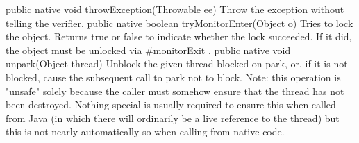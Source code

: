  public native  void throwException(Throwable ee)
Throw the exception without telling the verifier.
 public native boolean tryMonitorEnter(Object o)
Tries to lock the object.  Returns true or false to indicate
whether the lock succeeded.  If it did, the object must be
unlocked via #monitorExit .
 public native  void unpark(Object thread)
Unblock the given thread blocked on park, or, if it is
not blocked, cause the subsequent call to park not to
block.  Note: this operation is "unsafe" solely because the
caller must somehow ensure that the thread has not been
destroyed. Nothing special is usually required to ensure this
when called from Java (in which there will ordinarily be a live
reference to the thread) but this is not nearly-automatically
so when calling from native code.